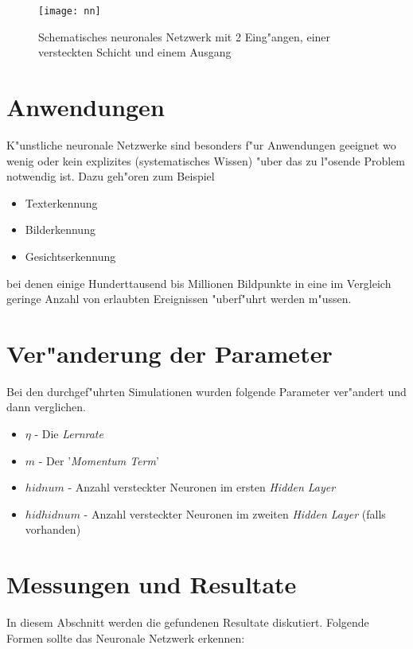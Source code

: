\documentclass[10pt]{article}
\begin{document}
\begin{figure}[h!]
\centering
\texttt{[image: nn]}
\caption{Schematisches neuronales Netzwerk mit 2 Eing"angen, einer versteckten Schicht und einem Ausgang\cite{wikipedia}}
\end{figure}


\section{Anwendungen}

K"unstliche neuronale Netzwerke sind besonders f"ur Anwendungen geeignet wo wenig oder kein explizites (systematisches Wissen) "uber das zu l"osende Problem notwendig ist. Dazu geh"oren zum Beispiel

\begin{itemize}
\item Texterkennung
\item Bilderkennung
\item Gesichtserkennung
\end{itemize}

bei denen einige Hunderttausend bis Millionen Bildpunkte in eine im Vergleich geringe Anzahl von erlaubten Ereignissen "uberf"uhrt werden m"ussen.

\section{Ver"anderung der Parameter}

Bei den durchgef"uhrten Simulationen wurden folgende Parameter ver"andert und dann verglichen.

\begin{itemize}
\item $\eta$ - Die \textit{Lernrate}
\item $m$    - Der '\textit{Momentum Term}'
\item $hidnum$ - Anzahl versteckter Neuronen im ersten \textit{Hidden Layer}
\item $hidhidnum$ - Anzahl versteckter Neuronen im zweiten \textit{Hidden Layer} (falls vorhanden)
\end{itemize}

\section{Messungen und Resultate}

In diesem Abschnitt werden die gefundenen Resultate diskutiert. Folgende Formen sollte das Neuronale Netzwerk erkennen:
\end{document}
